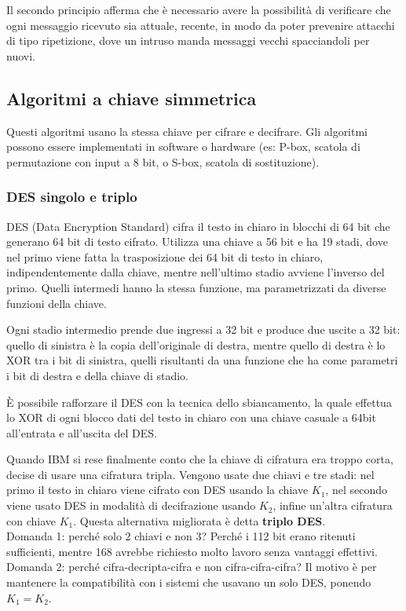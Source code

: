 Il secondo principio afferma che è necessario avere la possibilità di verificare che ogni messaggio ricevuto sia attuale, recente, in modo da poter prevenire attacchi di tipo ripetizione, dove un intruso manda messaggi vecchi spacciandoli per nuovi.

\subsection{Algoritmi a chiave simmetrica} %
Questi algoritmi usano la stessa chiave per cifrare e decifrare.
Gli algoritmi possono essere implementati in software o hardware (es: P-box, scatola di permutazione con input a 8 bit, o S-box, scatola di sostituzione).

\subsubsection{DES singolo e triplo}
DES (Data Encryption Standard) cifra il testo in chiaro in blocchi di 64 bit che generano 64 bit di testo cifrato.
Utilizza una chiave a 56 bit e ha 19 stadi, dove nel primo viene fatta la trasposizione dei 64 bit di testo in chiaro,
indipendentemente dalla chiave, mentre nell'ultimo stadio avviene l'inverso del primo. 
Quelli intermedi hanno la stessa funzione, ma parametrizzati da diverse funzioni della chiave.

Ogni stadio intermedio prende due ingressi a 32 bit e produce due uscite a 32 bit:
quello di sinistra è la copia dell'originale di destra, mentre quello di destra è lo XOR tra i bit di sinistra, quelli risultanti da una funzione che ha 
come parametri i bit di destra e della chiave di stadio.

\`E possibile rafforzare il DES con la tecnica dello sbiancamento, la quale effettua lo XOR di ogni blocco dati del testo in chiaro con una chiave casuale a 64bit all'entrata e all'uscita del DES. 

Quando IBM si rese finalmente conto che la chiave di cifratura era troppo corta, decise di usare una cifratura tripla.
Vengono usate due chiavi e tre stadi: nel primo il testo in chiaro viene cifrato con DES usando la chiave $K_1$, nel secondo viene usato DES in modalità di decifrazione usando $K_2$, infine un'altra cifratura con chiave $K_1$.
Questa alternativa migliorata è detta \textbf{triplo DES}.\\
Domanda 1: perché solo 2 chiavi e non 3? Perché i 112 bit erano ritenuti sufficienti, mentre 168 avrebbe richiesto molto lavoro senza vantaggi effettivi.\\
Domanda 2: perché cifra-decripta-cifra e non cifra-cifra-cifra? Il motivo è per mantenere la compatibilità con i sistemi che usavano un solo DES, ponendo $K_1=K_2$.

